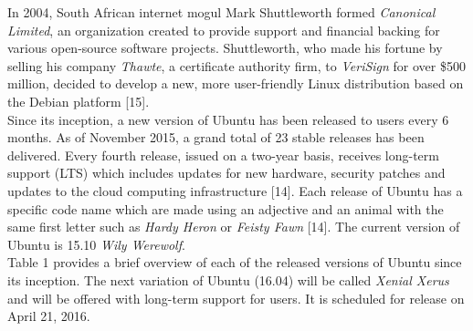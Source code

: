 \documentclass[11pt]{article}
\begin{document}
In 2004, South African internet mogul Mark Shuttleworth formed \emph{Canonical Limited}, an organization created to provide support and financial backing for various open-source software projects. Shuttleworth, who made his fortune by selling his company \emph{Thawte}, a certificate authority firm, to \emph{VeriSign} for over \$500 million, decided to develop a new, more user-friendly Linux distribution based on the Debian platform [15].\\

Since its inception, a new version of Ubuntu has been released to users every 6 months. As of November 2015, a grand total of 23 stable releases has been delivered. Every fourth release, issued on a two-year basis, receives long-term support (LTS) which includes updates for new hardware, security patches and updates to the cloud computing infrastructure [14]. Each release of Ubuntu has a specific code name which are made using an adjective and an animal with the same first letter such as \emph{Hardy Heron} or \emph{Feisty Fawn} [14]. The current version of Ubuntu is 15.10 \emph{Wily Werewolf}. \\

Table 1 provides a brief overview of each of the released versions of Ubuntu since its inception. The next variation of Ubuntu (16.04) will be called \emph{Xenial Xerus} and will be offered with long-term support for users. It is scheduled for release on April 21, 2016. 
\end{document}
